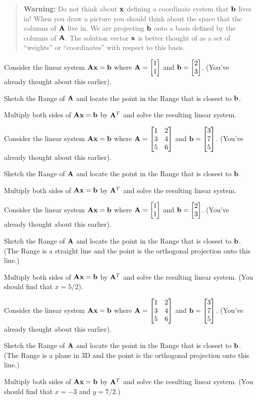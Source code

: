 \begin{quote}
\textbf{Warning:} Do not think about $\mathbf{x}$ defining a coordinate system that $\mathbf{b}$ lives in! When you draw a picture you should think about the space that the columns of $\mathbf{A}$ live in. We are projecting $\mathbf{b}$ onto a basis defined by the columns of $\mathbf{A}$. The solution vector $\mathbf{x}$ is better thought of as a set of ``weights'' or ``coordinates'' with respect to this basis.
\end{quote}

\begin{prob}
\be
\item Consider the linear system $\mathbf{A} \mathbf{x} = \mathbf{b}$ where $\mathbf{A} = \begin{bmatrix} 1 \\ 1 \end{bmatrix}$ and $\mathbf{b} = \begin{bmatrix} 2 \\ 3 \end{bmatrix}$. (You've already thought about this earlier). 
\be
\item Sketch the Range of $\mathbf{A}$ and locate the point in the Range that is closest to $\mathbf{b}$.
\item Multiply both sides of $\mathbf{A} \mathbf{x} = \mathbf{b}$ by $\mathbf{A}^T$ and solve the resulting linear system.
\ee
\item Consider the linear system $\mathbf{A} \mathbf{x} = \mathbf{b}$ where $\mathbf{A} = \begin{bmatrix} 1 & 2 \\ 3 & 4 \\ 5 & 6 \end{bmatrix}$ and $\mathbf{b} = \begin{bmatrix} 3 \\ 7 \\ 5 \end{bmatrix}$. (You've already thought about this earlier). 
\be
\item Sketch the Range of $\mathbf{A}$ and locate the point in the Range that is closest to $\mathbf{b}$.
\item Multiply both sides of $\mathbf{A} \mathbf{x} = \mathbf{b}$ by $\mathbf{A}^T$ and solve the resulting linear system.
\ee
\ee
\end{prob}
\begin{sol}
\be
\item Consider the linear system $\mathbf{A} \mathbf{x} = \mathbf{b}$ where $\mathbf{A} = \begin{bmatrix} 1 \\ 1 \end{bmatrix}$ and $\mathbf{b} = \begin{bmatrix} 2 \\ 3 \end{bmatrix}$. (You've already thought about this earlier). 
\be
\item Sketch the Range of $\mathbf{A}$ and locate the point in the Range that is closest to $\mathbf{b}$. (The Range is a straight line and the point is the orthogonal projection onto this line.)
\item Multiply both sides of $\mathbf{A} \mathbf{x} = \mathbf{b}$ by $\mathbf{A}^T$ and solve the resulting linear system. (You should find that $x = 5/2$).
\ee
\item Consider the linear system $\mathbf{A} \mathbf{x} = \mathbf{b}$ where $\mathbf{A} = \begin{bmatrix} 1 & 2 \\ 3 & 4 \\ 5 & 6 \end{bmatrix}$ and $\mathbf{b} = \begin{bmatrix} 3 \\ 7 \\ 5 \end{bmatrix}$. (You've already thought about this earlier). 
\be
\item Sketch the Range of $\mathbf{A}$ and locate the point in the Range that is closest to $\mathbf{b}$. (The Range is a plane in 3D and the point is the orthogonal projection onto this line.)
\item Multiply both sides of $\mathbf{A} \mathbf{x} = \mathbf{b}$ by $\mathbf{A}^T$ and solve the resulting linear system. (You should find that $x=-3$ and $y=7/2$.)
\ee
\ee
\end{sol}
